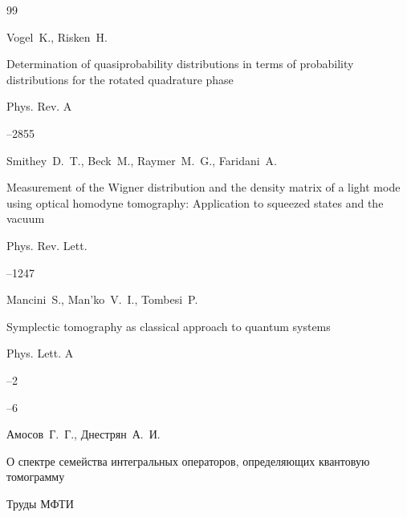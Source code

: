 \begin{thebibliography}{99}




\by Vogel~K., Risken~H.

\paper Determination of quasiprobability distributions in  terms of probability distributions for the rotated  quadrature phase

\jour Phys. Rev. A




--2855





\by  Smithey~D.~T., Beck~M., Raymer~M.~G., Faridani~A.

\paper Measurement of the Wigner distribution and the density matrix of a light mode using optical homodyne tomography: Application to squeezed states and the vacuum

\jour Phys. Rev. Lett.




--1247









\by   Mancini~S.,  Man'ko~V.~I.,  Tombesi~P.

\paper Symplectic tomography as classical approach to quantum systems

 \jour Phys. Lett. A



--2

--6





\by  Амосов~Г.~Г., Днестрян~А.~И.

\paper О спектре семейства  интегральных операторов, определяющих квантовую  томограмму

\jour Труды МФТИ


\end{thebibliography}
